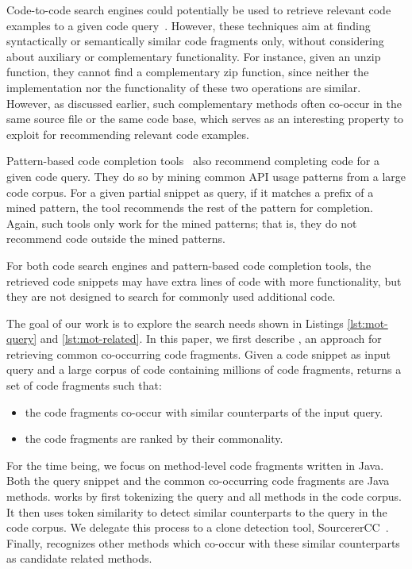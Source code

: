

Code-to-code search engines could potentially be used to retrieve relevant code examples
to a given code query~\cite{kim2018Facoy, krugle, searchcode}. 
However, these techniques aim at finding syntactically or semantically 
similar code fragments only, without considering about auxiliary or complementary functionality. 
For instance, given an unzip function, they cannot find a complementary zip function, since neither
the implementation nor the functionality of these two operations are similar. However, as discussed earlier,
such complementary methods often co-occur in the same source file or the same code base, which serves as 
an interesting property to exploit for recommending relevant code examples.

Pattern-based code completion tools~\cite{nguyen2009groum,
  nguyen2012grapacc} also recommend completing code for a given code
query. They do so by mining common API usage patterns from a large
code corpus. For a given partial snippet as query, if it matches a
prefix of a mined pattern, the tool recommends the rest of the pattern
for completion. Again, such tools only work for the mined patterns;
that is, they do not recommend code outside the mined patterns.

For both code search engines and pattern-based code completion tools,
the retrieved code snippets may have extra lines of code with more
functionality, but they are not designed to search for commonly used
additional code.

The goal of our work is to explore the search needs shown in Listings
\ref{lst:mot-query} and \ref{lst:mot-related}. In this paper, we first
describe {\tool}, an approach for retrieving common co-occurring code fragments. 
Given a code snippet as input query and a large corpus of code containing
millions of code fragments, {\tool} returns a set of code
fragments such that:
\begin{itemize}
	\item the code fragments co-occur with similar counterparts of the input query.
	\item the code fragments are ranked by their commonality.
\end{itemize}


For the time being, we focus on method-level code fragments written in
Java. Both the query snippet and the common co-occurring code
fragments are Java methods. {\tool} works by first tokenizing the
query and all methods in the code corpus. It then uses token
similarity to detect similar counterparts to the query in the code
corpus. We delegate this process to a clone detection tool,
SourcererCC~\cite{sajnani2016sourcerercc}. Finally, {\tool} recognizes
other methods which co-occur with these similar counterparts as
candidate related methods.

